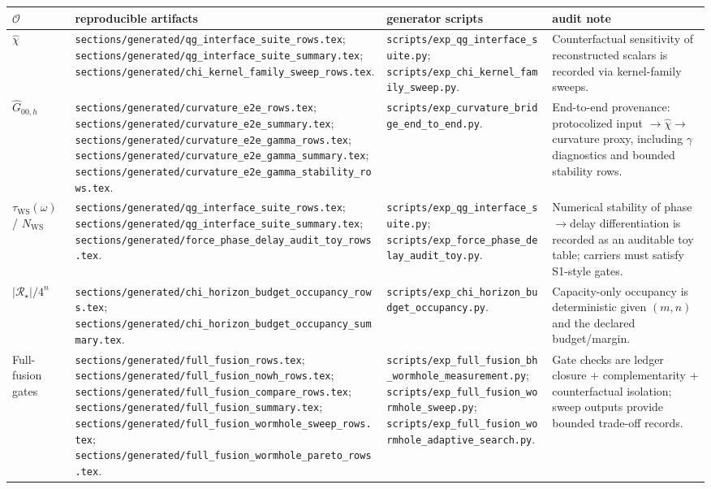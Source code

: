 \begin{center}
\scriptsize
\setlength{\tabcolsep}{6pt}
\renewcommand{\arraystretch}{1.15}
\begin{tabular}{p{} p{} p{} p{}}
\toprule
$\mathcal{O}$ & reproducible artifacts & generator scripts & audit note \\
\midrule
$\widehat\chi$ & \texttt{sections/generated/qg\_interface\_suite\_rows.tex}; \texttt{sections/generated/qg\_interface\_suite\_summary.tex}; \texttt{sections/generated/chi\_kernel\_family\_sweep\_rows.tex}. & \texttt{scripts/exp\_qg\_interface\_suite.py}; \texttt{scripts/exp\_chi\_kernel\_family\_sweep.py}. & Counterfactual sensitivity of reconstructed scalars is recorded via kernel-family sweeps. \\
$\widehat G_{00,h}$ & \texttt{sections/generated/curvature\_e2e\_rows.tex}; \texttt{sections/generated/curvature\_e2e\_summary.tex}; \texttt{sections/generated/curvature\_e2e\_gamma\_rows.tex}; \texttt{sections/generated/curvature\_e2e\_gamma\_summary.tex}; \texttt{sections/generated/curvature\_e2e\_gamma\_stability\_rows.tex}. & \texttt{scripts/exp\_curvature\_bridge\_end\_to\_end.py}. & End-to-end provenance: protocolized input $\rightarrow \widehat\chi \rightarrow$ curvature proxy, including $\gamma$ diagnostics and bounded stability rows. \\
$\tau_{\mathrm{WS}}(\omega)$ / $N_{\mathrm{WS}}$ & \texttt{sections/generated/qg\_interface\_suite\_rows.tex}; \texttt{sections/generated/qg\_interface\_suite\_summary.tex}; \texttt{sections/generated/force\_phase\_delay\_audit\_toy\_rows.tex}. & \texttt{scripts/exp\_qg\_interface\_suite.py}; \texttt{scripts/exp\_force\_phase\_delay\_audit\_toy.py}. & Numerical stability of phase$\rightarrow$delay differentiation is recorded as an auditable toy table; carriers must satisfy S1-style gates. \\
$|\mathcal{R}_\star|/4^n$ & \texttt{sections/generated/chi\_horizon\_budget\_occupancy\_rows.tex}; \texttt{sections/generated/chi\_horizon\_budget\_occupancy\_summary.tex}. & \texttt{scripts/exp\_chi\_horizon\_budget\_occupancy.py}. & Capacity-only occupancy is deterministic given $(m,n)$ and the declared budget/margin. \\
Full-fusion gates & \texttt{sections/generated/full\_fusion\_rows.tex}; \texttt{sections/generated/full\_fusion\_nowh\_rows.tex}; \texttt{sections/generated/full\_fusion\_compare\_rows.tex}; \texttt{sections/generated/full\_fusion\_summary.tex}; \texttt{sections/generated/full\_fusion\_wormhole\_sweep\_rows.tex}; \texttt{sections/generated/full\_fusion\_wormhole\_pareto\_rows.tex}. & \texttt{scripts/exp\_full\_fusion\_bh\_wormhole\_measurement.py}; \texttt{scripts/exp\_full\_fusion\_wormhole\_sweep.py}; \texttt{scripts/exp\_full\_fusion\_wormhole\_adaptive\_search.py}. & Gate checks are ledger closure + complementarity + counterfactual isolation; sweep outputs provide bounded trade-off records. \\
\bottomrule
\end{tabular}
\end{center}